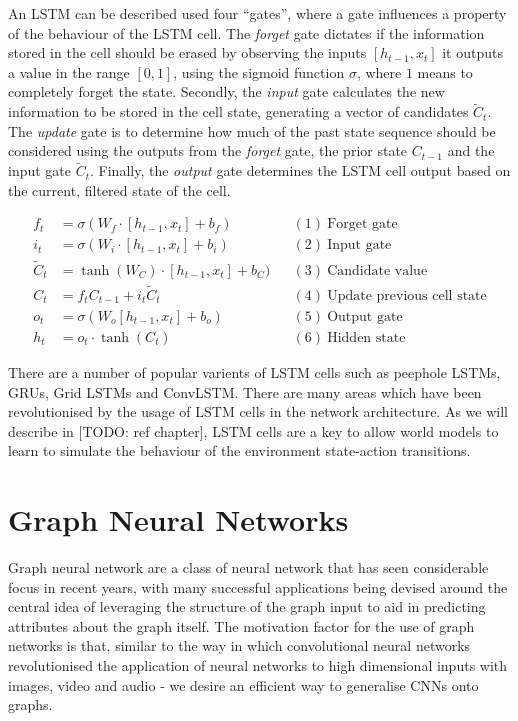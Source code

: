 An LSTM can be described used four ``gates'', where a gate influences a property of the behaviour of the LSTM cell. The \textit{forget} gate dictates if the information stored in the cell should be erased by observing the inputs $[h_{t-1}, x_t]$ it outputs a value in the range $[0, 1]$, using the sigmoid function $\sigma$, where $1$ means to completely forget the state. Secondly, the \textit{input} gate calculates the new information to be stored in the cell state, generating a vector of candidates $\tilde{C}_t$. The \textit{update} gate is to determine how much of the past state sequence should be considered using the outputs from the \textit{forget} gate, the prior state $C_{t-1}$ and the input gate $\tilde{C}_t$. Finally, the \textit{output} gate determines the LSTM cell output based on the current, filtered state of the cell.

\begin{center}
  \begin{align*}
    f_t &= \sigma (W_f \cdot [h_{t-1}, x_t] + b_f) && (1)~\text{Forget gate} \\
    i_t &= \sigma (W_i \cdot [h_{t-1}, x_t] + b_i) && (2)~\text{Input gate} \\
    \tilde{C}_t &= \tanh (W_C) \cdot [h_{t-1}, x_t] + b_C) && (3)~\text{Candidate value} \\
    C_t &= f_t C_{t-1} + i_t \tilde{C}_t && (4)~\text{Update previous cell state} \\
    o_t &= \sigma (W_o [h_{t-1}, x_t] + b_o) && (5)~\text{Output gate} \\
    h_t &= o_t \cdot \tanh (C_t) && (6)~\text{Hidden state}
  \end{align*}
\end{center}

There are a number of popular varients of LSTM cells such as peephole LSTMs, GRUs, Grid LSTMs and ConvLSTM. There are many areas which have been revolutionised by the usage of LSTM cells in the network architecture. As we will describe in [TODO: ref chapter], LSTM cells are a key to allow world models to learn to simulate the behaviour of the environment state-action transitions.

\section{Graph Neural Networks}

Graph neural network are a class of neural network that has seen considerable focus in recent years, with many successful applications being devised around the central idea of leveraging the structure of the graph input to aid in predicting attributes about the graph itself. The motivation factor for the use of graph networks is that, similar to the way in which convolutional neural networks revolutionised the application of neural networks to high dimensional inputs with images, video and audio - we desire an efficient way to generalise CNNs onto graphs.

